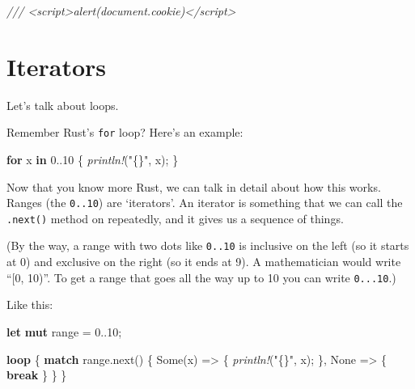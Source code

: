 \documentclass[a4paper,]{book}
\renewcommand*{\hypertarget}[3][\ar]{%
  \def\ar{#2}%
  \label{#1}%
  #3}
\newenvironment{Shaded}{\begin{snugshade}}{\end{snugshade}}
\newcommand{\KeywordTok}[1]{\textcolor[rgb]{0.13,0.29,0.53}{\textbf{{#1}}}}
\newcommand{\DecValTok}[1]{\textcolor[rgb]{0.00,0.00,0.81}{{#1}}}
\newcommand{\ConstantTok}[1]{\textcolor[rgb]{0.00,0.00,0.00}{{#1}}}
\newcommand{\StringTok}[1]{\textcolor[rgb]{0.31,0.60,0.02}{{#1}}}
\newcommand{\CommentTok}[1]{\textcolor[rgb]{0.56,0.35,0.01}{\textit{{#1}}}}
\newcommand{\PreprocessorTok}[1]{\textcolor[rgb]{0.56,0.35,0.01}{\textit{{#1}}}}
\newcommand{\NormalTok}[1]{{#1}}
\begin{document}
\begin{Shaded}
\begin{Highlighting}[]
\CommentTok{/// <script>alert(document.cookie)</script>}
\end{Highlighting}
\end{Shaded}

\hypertarget{sec--iterators}{\section{Iterators}\label{sec--iterators}}

Let's talk about loops.

Remember Rust's \texttt{for} loop? Here's an example:

\begin{Shaded}
\begin{Highlighting}[]
\KeywordTok{for} \NormalTok{x }\KeywordTok{in} \DecValTok{0.}\NormalTok{.}\DecValTok{10} \NormalTok{\{}
    \PreprocessorTok{println!}\NormalTok{(}\StringTok{"\{\}"}\NormalTok{, x);}
\NormalTok{\}}
\end{Highlighting}
\end{Shaded}

Now that you know more Rust, we can talk in detail about how this works.
Ranges (the \texttt{0..10}) are `iterators'. An iterator is something
that we can call the \texttt{.next()} method on repeatedly, and it gives
us a sequence of things.

(By the way, a range with two dots like \texttt{0..10} is inclusive on
the left (so it starts at 0) and exclusive on the right (so it ends at
9). A mathematician would write ``{[}0, 10)''. To get a range that goes
all the way up to 10 you can write \texttt{0...10}.)

Like this:

\begin{Shaded}
\begin{Highlighting}[]
\KeywordTok{let} \KeywordTok{mut} \NormalTok{range = }\DecValTok{0.}\NormalTok{.}\DecValTok{10}\NormalTok{;}

\KeywordTok{loop} \NormalTok{\{}
    \KeywordTok{match} \NormalTok{range.next() \{}
        \ConstantTok{Some}\NormalTok{(x) => \{}
            \PreprocessorTok{println!}\NormalTok{(}\StringTok{"\{\}"}\NormalTok{, x);}
        \NormalTok{\},}
        \ConstantTok{None} \NormalTok{=> \{ }\KeywordTok{break} \NormalTok{\}}
    \NormalTok{\}}
\NormalTok{\}}
\end{Highlighting}
\end{Shaded}
\end{document}
